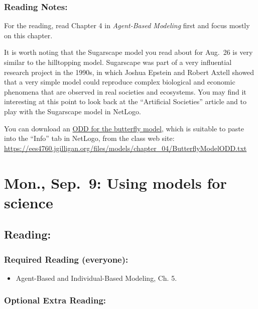 \documentclass[
]{article}
\providecommand{\tightlist}{%
  \setlength{\itemsep}{0pt}\setlength{\parskip}{0pt}}
\begin{document}
\subsubsection{Reading Notes:}\label{reading-notes-3}

For the reading, read Chapter 4 in \emph{Agent-Based Modeling} first and
focus mostly on this chapter.

It is worth noting that the Sugarscape model you read about for Aug.~26
is very similar to the hilltopping model. Sugarscape was part of a very
influential research project in the 1990s, in which Joshua Epstein and
Robert Axtell showed that a very simple model could reproduce complex
biological and economic phenomena that are observed in real societies
and ecosystems. You may find it interesting at this point to look back
at the ``Artificial Societies'' article and to play with the Sugarscape
model in NetLogo.

You can download an
\href{/files/models/chapter_04/ButterflyModelODD.txt}{ODD for the
butterfly model}, which is suitable to paste into the ``Info'' tab in
NetLogo, from the class web site:
\url{https://ees4760.jgilligan.org/files/models/chapter_04/ButterflyModelODD.txt}

\section{Mon., Sep.~9: Using models for
science}\label{mon.-sep.-9-using-models-for-science}

\subsection{Reading:}\label{reading-5}

\subsubsection{Required Reading
(everyone):}\label{required-reading-everyone-4}

\begin{itemize}
\tightlist
\item
  Agent-Based and Individual-Based Modeling, Ch. 5.
\end{itemize}

\subsubsection{Optional Extra Reading:}\label{optional-extra-reading-2}
\end{document}
